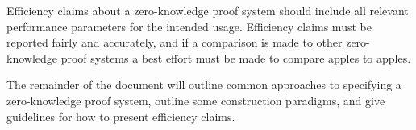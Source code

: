 Efficiency claims about a zero-knowledge proof system should include all relevant performance parameters for the intended usage.
Efficiency claims must be reported fairly and accurately, and if a comparison is made to other zero-knowledge proof systems a best effort must be made to compare apples to apples.

The remainder of the document will outline common approaches to specifying 
a zero-knowledge proof system, outline some construction paradigms, and give guidelines for how to present efficiency claims.
\loosen

